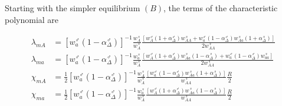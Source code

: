\documentclass[12pt]{article}
\begin{document}
Starting with the simpler equilibrium $(B)$, the terms of the characteristic polynomial are

\begin{subequations}\label{Binvasion}
\begin{align}
\lambda_{mA}&= \left[w_{a}^\male (1-\alpha^\male_\Delta) \right]^{-1}
\frac{w_{A}^\female }{w_{A}^\female}
\frac{\left[ w_{A}^\male (1+\alpha^\male_\Delta) w_{AA}^\female + 
w_{a}^\male (1-\alpha^\male_\Delta) w_{Aa}^\female (1+\alpha^\female_\Delta) \right]}
{ 2w_{AA}^\female } \\
\lambda_{ma}&= \left[w_{a}^\male (1-\alpha^\male_\Delta) \right]^{-1}
\frac{w_{a}^\female}{w_{A}^\female}
\frac{\left[  w_{A}^\male (1+\alpha^\male_\Delta) w_{Aa}^\female (1-\alpha^\female_\Delta)+
w_{a}^\male (1-\alpha^\male_\Delta) w_{aa}^\female \right]}
{ 2w_{AA}^\female } \\
\chi_{mA}&= \frac{1}{2} \left[w_{a}^\male (1-\alpha^\male_\Delta) \right]^{-1}
\frac{w_{A}^\female }{w_{A}^\female}
 \frac{\left[  w_{a}^\male (1-\alpha^\male_\Delta) w_{Aa}^\female (1 + \alpha^\female_\Delta) \right]}
{ w_{AA}^\female } \frac{R}{2}\\
\chi_{ma}&= \frac{1}{2} \left[w_{a}^\male (1-\alpha^\male_\Delta) \right]^{-1}
\frac{w_{a}^\female}{w_{A}^\female}
 \frac{\left[  w_{A}^\male (1+\alpha^\male_\Delta) w_{Aa}^\female (1-\alpha^\female_\Delta) \right]}
{  w_{AA}^\female} \frac{R}{2}
\end{align}
\end{subequations}
\end{document}
